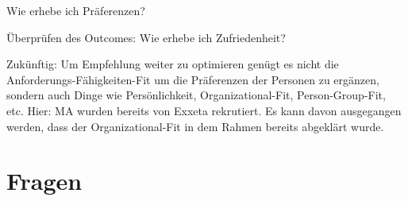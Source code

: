 Wie erhebe ich Präferenzen? %

Überprüfen des Outcomes:
Wie erhebe ich Zufriedenheit? %

Zukünftig:
Um Empfehlung weiter zu optimieren genügt es nicht die Anforderungs-Fähigkeiten-Fit um die Präferenzen der Personen zu ergänzen, sondern auch Dinge wie Persönlichkeit, Organizational-Fit, Person-Group-Fit, etc.
Hier: MA wurden bereits von Exxeta rekrutiert. Es kann davon ausgegangen werden, dass der Organizational-Fit in dem Rahmen bereits abgeklärt wurde.

\newpage

\section{Fragen}
\label{ch:notizen:fragen}

